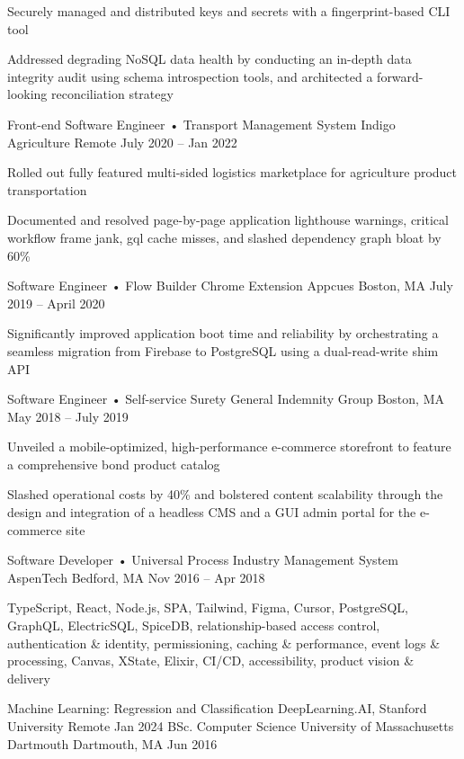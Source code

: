 \documentclass[]{awesome-cv}
\begin{document}
\begin{cventries}
{\begin{cvitems}
		\item {Securely managed and distributed keys and secrets with a fingerprint-based CLI tool}
		\item {Addressed degrading NoSQL data health by conducting an in-depth data integrity audit using schema introspection tools, and architected a forward-looking reconciliation strategy}
		\end{cvitems}}
	\cventry
	{Front-end Software Engineer • Transport Management System}
	{Indigo Agriculture}
	{Remote}
	{July 2020 – Jan 2022}
	{\begin{cvitems}
		\item {Rolled out fully featured multi-sided logistics marketplace for agriculture product transportation}
		\item {Documented and resolved page-by-page application lighthouse warnings, critical workflow frame jank, gql cache misses, and slashed dependency graph bloat by 60\%}
		\end{cvitems}}
	\cventry
	{Software Engineer • Flow Builder Chrome Extension}
	{Appcues}
	{Boston, MA}
	{July 2019 – April 2020}
	{\begin{cvitems}
		\item {Significantly improved application boot time and reliability by orchestrating a seamless migration from Firebase to PostgreSQL using a dual-read-write shim API}
		\end{cvitems}}
	\cventry
	{Software Engineer • Self-service Surety}
	{General Indemnity Group}
	{Boston, MA}
	{May 2018 – July 2019}
	{\begin{cvitems}
		\item {Unveiled a mobile-optimized, high-performance e-commerce storefront to feature a comprehensive bond product catalog}
		\item {Slashed operational costs by 40\% and bolstered content scalability through the design and integration of a headless CMS and a GUI admin portal for the e-commerce site}
		\end{cvitems}}
	\cventry
	{Software Developer • Universal Process Industry Management System}
	{AspenTech}
	{Bedford, MA}
	{Nov 2016 – Apr 2018}
	{}
\end{cventries}

\vspace{-2mm}

TypeScript, React, Node.js, SPA, Tailwind, Figma, Cursor, PostgreSQL, GraphQL, ElectricSQL, SpiceDB, relationship-based access control, authentication \& identity, permissioning, caching \& performance, event logs \& processing, Canvas, XState, Elixir, CI/CD, accessibility, product vision \& delivery

\begin{cvhonors}
	\cvhonor
	{Machine Learning: Regression and Classification}
	{DeepLearning.AI, Stanford University}
	{Remote}
	{Jan 2024}
	\cvhonor
	{BSc. Computer Science}
	{University of Massachusetts Dartmouth}
	{Dartmouth, MA}
	{Jun 2016}
\end{cvhonors}
\end{document}
